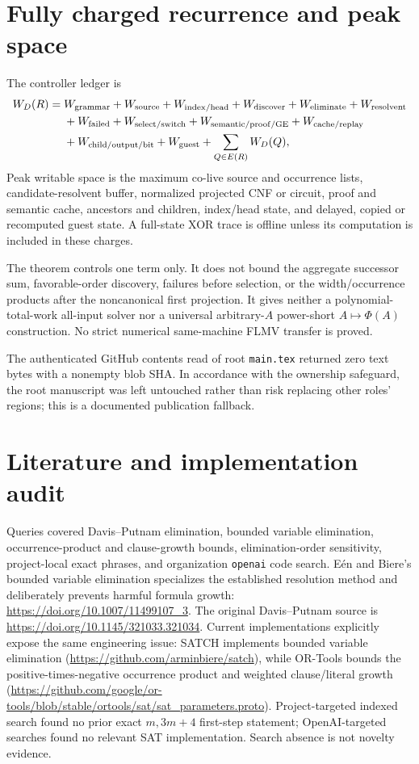 \documentclass[11pt]{article}
\begin{document}
\section{Fully charged recurrence and peak space}

The controller ledger is
\begin{align*}
W_D(R)={}&W_{\rm grammar}+W_{\rm source}+W_{\rm index/head}
+W_{\rm discover}+W_{\rm eliminate}+W_{\rm resolvent}\\
&+W_{\rm failed}+W_{\rm select/switch}+W_{\rm semantic/proof/GE}
+W_{\rm cache/replay}\\
&+W_{\rm child/output/bit}+W_{\rm guest}
+\sum_{Q\in E(R)}W_D(Q),
\end{align*}
Peak writable space is the maximum co-live source and occurrence lists,
candidate-resolvent buffer, normalized projected CNF or circuit, proof and
semantic cache, ancestors and children, index/head state, and delayed, copied
or recomputed guest state.  A full-state XOR trace is offline unless its
computation is included in these charges.

The theorem controls one term only.  It does not bound the aggregate
successor sum, favorable-order discovery, failures before selection, or the
width/occurrence products after the noncanonical first projection.  It gives
neither a polynomial-total-work all-input solver nor a universal
arbitrary-$A$ power-short $A\mapsto\Phi(A)$ construction.  No strict numerical
same-machine FLMV transfer is proved.

The authenticated GitHub contents read of root \texttt{main.tex} returned zero
text bytes with a nonempty blob SHA.  In accordance with the ownership
safeguard, the root manuscript was left untouched rather than risk replacing
other roles' regions; this is a documented publication fallback.

\section{Literature and implementation audit}

Queries covered Davis--Putnam elimination, bounded variable elimination,
occurrence-product and clause-growth bounds, elimination-order sensitivity,
project-local exact phrases, and organization \texttt{openai} code search.
E\'en and Biere's bounded variable elimination specializes the established
resolution method and deliberately prevents harmful formula growth:
\url{https://doi.org/10.1007/11499107_3}.  The original Davis--Putnam source
is \url{https://doi.org/10.1145/321033.321034}.  Current implementations
explicitly expose the same engineering issue: SATCH implements bounded
variable elimination
(\url{https://github.com/arminbiere/satch}), while OR-Tools bounds the
positive-times-negative occurrence product and weighted clause/literal growth
(\url{https://github.com/google/or-tools/blob/stable/ortools/sat/sat_parameters.proto}).
Project-targeted indexed search found no prior exact $m,3m+4$ first-step
statement; OpenAI-targeted searches found no relevant SAT implementation.
Search absence is not novelty evidence.
\end{document}
